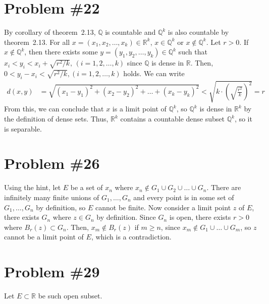 \documentclass{scrartcl}
\begin{document}
\section{Problem \#22}
By corollary of theorem~2.13, \(\mathbb{Q}\) is countable and \(\mathbb{Q}^k\) is also countable by theorem~2.13.
For all \(x = (x_1, x_2, \dots, x_k) \in \mathbb{R}^k\), \(x \in \mathbb{Q}^k\) or \(x \not \in \mathbb{Q}^k\).
Let \(r > 0\).
If \(x \not \in \mathbb{Q}^k\), then there exists some \(y = (y_1, y_2, \dots, y_k) \in \mathbb{Q}^k\) such that \(x_i < y_i < x_i + \sqrt{r^2 / k},\, (i = 1, 2, \dots, k)\) since \(\mathbb{Q}\) is dense in \(\mathbb{R}\).
Then, \(0 < y_i - x_i < \sqrt{r^2 / k}, (i = 1, 2, \dots, k)\) holds.
We can write
\begin{align*}
  d(x, y) &= \sqrt{(x_1 - y_1)^2 + (x_2 - y_2)^2 + \dots + (x_k - y_k)^2} < \sqrt{k \cdot \left( \sqrt{\frac{r^2}{k}} \right)^2} = r
\end{align*}
From this, we can conclude that \(x\) is a limit point of \(\mathbb{Q}^k\), so \(\mathbb{Q}^k\) is dense in \(\mathbb{R}^k\) by the definition of dense sets.
Thus, \(\mathbb{R}^k\) contains a countable dense subset \(\mathbb{Q}^k\), so it is separable.

\section{Problem \#26}
Using the hint, let \(E\) be a set of \(x_n\) where \(x_n \not \in G_1 \cup G_2 \cup \dots \cup G_n\).
There are infinitely many finite unions of \(G_1, \dots, G_n\) and every point is in some set of \(G_1, \dots, G_n\) by definition, so \(E\) cannot be finite.
Now consider a limit point \(z\) of \(E\), there exists \(G_n\) where \(z \in G_n\) by definition.
Since \(G_n\) is open, there exists \(r > 0\) where \(B_r(z) \subset G_n\).
Then, \(x_m \not \in B_r(z)\) if \(m \geq n\), since \(x_m \not \in G_1 \cup \dots \cup G_m\), so \(z\) cannot be a limit point of \(E\), which is a contradiction.

\section{Problem \#29}
Let \(E \subset \mathbb{R}\) be such open subset.
\end{document}
